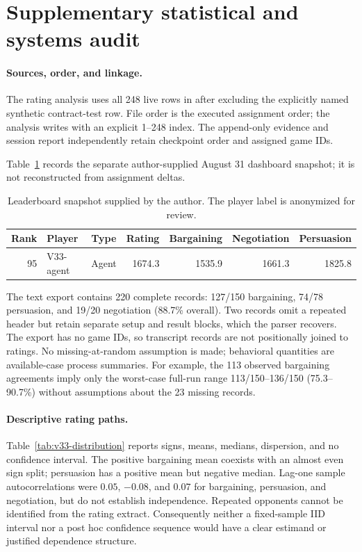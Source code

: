\section{Supplementary statistical and systems audit}
\label{app:statistics}

\paragraph{Sources, order, and linkage.}
The rating analysis uses all 248 live rows in
 after excluding the explicitly named
synthetic contract-test row. File order is the executed assignment order; the
analysis writes  with an explicit
1--248 index. The append-only evidence and session report independently retain
checkpoint order and assigned game IDs.

Table~\ref{tab:leaderboard-snapshot} records the separate author-supplied
August 31 dashboard snapshot; it is not reconstructed from assignment deltas.
\begin{table}[t]
  \caption{Leaderboard snapshot supplied by the author. The player label is
  anonymized for review.}
  \label{tab:leaderboard-snapshot}
  \centering\scriptsize
  \begin{tabular}{rllrrrr}
    \toprule
    Rank & Player & Type & Rating & Bargaining & Negotiation & Persuasion \\
    \midrule
    95 & V33-agent & Agent & 1674.3 & 1535.9 & 1661.3 & 1825.8 \\
    \bottomrule
  \end{tabular}
\end{table}

The text export contains 220 complete records: 127/150 bargaining, 74/78
persuasion, and 19/20 negotiation (88.7\% overall). Two records omit a repeated
header but retain separate setup and result blocks, which the parser recovers.
The export has no game IDs, so transcript records are not positionally joined to
ratings. No missing-at-random assumption is made; behavioral quantities are
available-case process summaries.
For example, the 113 observed bargaining agreements imply only the worst-case
full-run range 113/150--136/150 (75.3--90.7\%) without assumptions about the 23
missing records.

\paragraph{Descriptive rating paths.}
Table~\ref{tab:v33-distribution} reports signs, means, medians, dispersion, and
no confidence interval. The positive bargaining mean coexists with an almost
even sign split; persuasion has a positive mean but negative median. Lag-one
sample autocorrelations were $0.05$, $-0.08$, and $0.07$ for bargaining,
persuasion, and negotiation, but do not establish independence. Repeated
opponents cannot be identified from the rating extract. Consequently neither a
fixed-sample IID interval nor a post hoc confidence sequence would have a clear
estimand or justified dependence structure.

